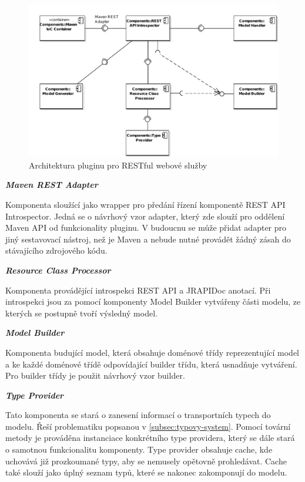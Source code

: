 \documentclass[11pt,twoside,a4paper]{book}
\begin{document}
\begin{figure}[h]
\begin{center}
\includegraphics[width=13cm]{images-pdf/RESTModelGenerator.pdf}
\caption{Architektura pluginu pro RESTful webové služby}
\label{fig:rest-plugin-architektura}
\end{center}
\end{figure}

\textbf{\textit{Maven REST Adapter}}

Komponenta sloužící jako wrapper pro předání řízení komponentě REST API Introspector.
Jedná se o návrhový vzor adapter, který zde slouží pro oddělení Maven API od funkcionality
pluginu. V budoucnu se může přidat adapter pro jiný sestavovací nástroj, než je
Maven a nebude nutné provádět žádný zásah do stávajícího zdrojového kódu.

\textbf{\textit{Resource Class Processor}}

Komponenta provádějící introspekci REST API a JRAPIDoc anotací. Při introspekci jsou za
pomocí komponenty Model Builder vytvářeny části modelu, ze kterých se postupně tvoří
výsledný model.

\textbf{\textit{Model Builder}}

Komponenta budující model, která obsahuje doménové třídy reprezentující model a
ke každé doménové třídě odpovídající builder třídu, která usnadňuje vytváření. Pro builder
třídy je použit návrhový vzor builder.

\textbf{\textit{Type Provider}}

Tato komponenta se stará o zanesení informací o transportních typech do modelu. Řeší
problematiku popsanou v \ref{subsec:typovy-system}. Pomocí tovární metody je prováděna
instanciace konkrétního type providera, který se dále stará o samotnou funkcionalitu komponenty. Type
provider obsahuje cache, kde uchovává již prozkoumané typy, aby se nemusely opětovně
prohledávat. Cache také slouží jako úplný seznam typů, které se nakonec zakomponují do
modelu.
\end{document}
